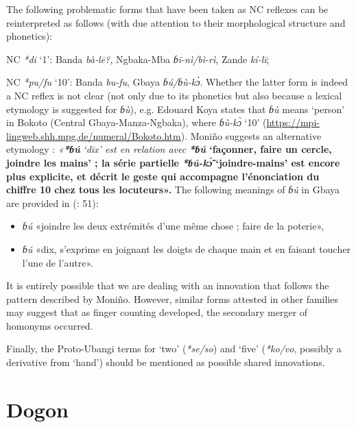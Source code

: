 The following problematic forms that have been taken as NC reflexes can be reinterpreted as follows (with due attention to their morphological structure and phonetics):

NC \textit{*di} ‘1’: Banda \textit{bà-l{\={e}}?,} Ngbaka-Mba \textit{ɓī-nì/bì-rì}, Zande \textit{kí-lī};

NC \textit{*pu/fu} ‘10’: Banda \textit{bu-fu}, Gbaya \textit{ɓú/ɓù-k{\`{ɔ}}}. Whether the latter form is indeed a NC reflex is not clear (not only due to its phonetics but also because a lexical etymology is suggested for \textit{ɓù}), e.g. Edouard Koya states that \textit{ɓù} means ‘person’ in Bokoto (Central Gbaya-Manza-Ngbaka), where \textit{ɓù-k{\`{ɔ}}} ‘10’ (\url{https://mpi-lingweb.shh.mpg.de/numeral/Bokoto.htm}). Moniño suggests an alternative etymology \citep[656]{Moñino1995}: \textit{«}\textbf{\textit{*ɓú} }\textit{‘dix’ est en relation avec} \textbf{\textit{*ɓú} ‘façonner, faire un cercle, joindre les mains’ ; la série partielle} \textbf{\textit{*ɓú-k{\'{\~ɔ}}} ‘joindre-mains’ est encore plus explicite, et décrit le geste qui accompagne l’énonciation du chiffre 10 chez tous les locuteurs».} The following meanings of \textit{ɓú} in Gbaya are provided in (\citealt{BlanchardNoss1982}: 51): 

\begin{itemize}
 \item  \textit{ɓú}  «joindre les deux extrémités d’une même chose ; faire de la poterie», 
 \item \textit{ɓú} «dix, s’exprime en joignant les doigts de chaque main et en faisant toucher l’une de l’autre». 
\end{itemize}





It is entirely possible that we are dealing with an innovation that follows the pattern described by Moniño. However, similar forms attested in other families may suggest that as finger counting developed, the secondary merger of homonyms occurred.

Finally, the Proto-Ubangi terms for ‘two’ (\textit{*se}\textit{/so}) and ‘five’ (\textit{*ko}\textit{/vo}, possibly a derivative from ‘hand’) should be mentioned as possible shared innovations. 


\section{Dogon}%

